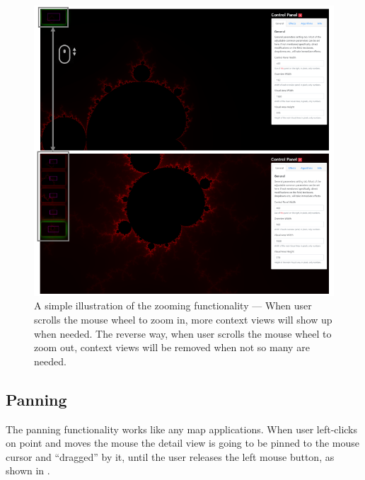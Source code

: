 \begin{figure}[H]
\centering
\includegraphics[width=\textwidth,keepaspectratio]{Figures/Chapter5/zooming.png}
\decoRule
\caption[Zooming Functionality]{A simple illustration of the zooming functionality --- When user scrolls the mouse wheel to zoom in, more context views will show up when needed. The reverse way, when user scrolls the mouse wheel to zoom out, context views will be removed when not so many are needed.}
\label{fig:chap5:zooming}
\end{figure}

\subsection{Panning}

The panning functionality works like any map applications. When user left-clicks on point and moves the mouse the detail view is going to be pinned to the mouse cursor and ``dragged'' by it, until the user releases the left mouse button, as shown in .

